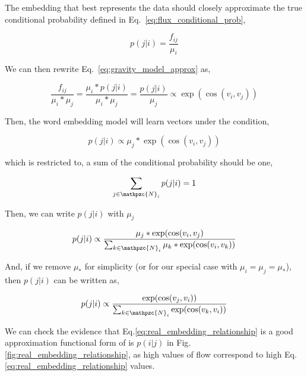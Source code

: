 \documentclass[12pt]{article} %
\begin{document}
The embedding that best represents the data should closely approximate the true conditional probability defined in
Eq.~\ref{eq:flux_conditional_prob},

\begin{equation}
    \label{eq:flux_conditional_prob}
    p(j|i) = \frac{f_{ij}}{\mu_i} 
\end{equation}

We can then rewrite Eq.~\ref{eq:gravity_model_approx} as, 

\begin{equation}
    \label{eq:gravity_relationship}
    \frac{f_{ij}}{\mu_i * \mu_j} = \frac{\mu_i * p(j|i)}{\mu_i * \mu_j} =  \frac{p(j|i)}{\mu_j} \propto \exp(\cos(v_i,v_j))
\end{equation}

Then, the word embedding model will learn vectors under the condition,

\begin{equation}
    \label{eq:conditional probability}
      p(j|i) \propto {\mu_j}* \exp(\cos(v_i,v_j))
\end{equation}

which is restricted to, a sum of the conditional probability should be one,

\begin{equation}
    \label{eq:sum of the conditional probabiitliy}
    \sum_{j\in\mathpzc{N}_i} p(j|i) = 1
\end{equation}

Then, we can write $p(j|i)$ with $\mu_{j}$

\begin{equation}
    p(j|i) \propto \frac{{\mu_j}* \exp(\cos(v_i,v_j)}{\sum_{k\in\mathpzc{N}_i} {\mu_k}* \exp(\cos(v_i,v_k))}
\end{equation}

And, if we remove ${\mu_*}$ for simplicity (or for our special case with $\mu_{i} = \mu_{j} = \mu_*$), then $p(j|i)$ can be written as,

\begin{equation}
    \label{eq:real_embedding_relationship}
    p(j|i) \propto \frac{\exp(\cos(v_j, v_i))}{\sum_{k\in\mathpzc{N}_i} \exp(\cos(v_k,v_i))}
\end{equation}

We can check the evidence that Eq.\ref{eq:real_embedding_relationship} is a good approximation functional form of is $p(i|j)$ in Fig. \ref{fig:real_embedding_relationship}, as high values of flow correspond to high Eq.\ref{eq:real_embedding_relationship} values.
\end{document}
